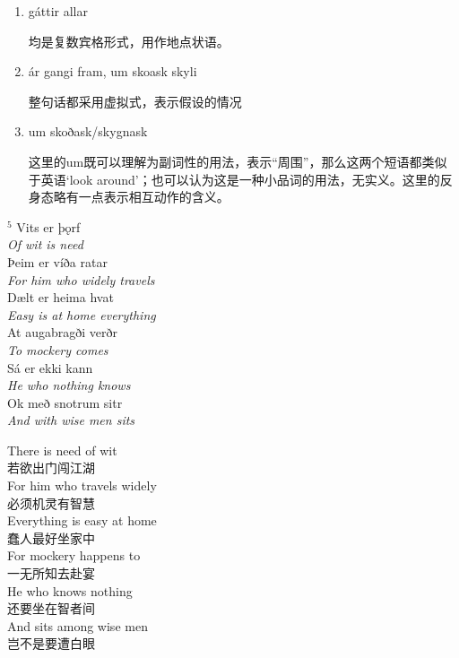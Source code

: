 \begin{grammar*}{}
    \begin{enumerate}[leftmargin=*]
        \item gáttir allar

              均是复数宾格形式，用作地点状语。

        \item \'a\dh r gangi fram, um sko\dh ask skyli

              整句话都采用虚拟式，表示假设的情况

        \item um skoðask/skygnask

              这里的um既可以理解为副词性的用法，表示“周围”，那么这两个短语都类似于英语`look around'；也可以认为这是一种小品词的用法，无实义。这里的反身态略有一点表示相互动作的含义。

    \end{enumerate}
\end{grammar*}
\medskip %
\begin{paracol}{2}
    \noindent
    $^5$ Vits er þǫrf\\
    \textit{Of wit is need}\\
    \MakeUppercase þeim er víða ratar\\
    \textit{For him who widely travels}\\
    Dælt er heima hvat\\
    \textit{Easy is at home everything}\\
    At augabragði verðr\\
    \textit{To mockery comes}\\
    Sá er ekki kann \\
    \textit{He who nothing knows}\\
    Ok með snotrum sitr\\
    \textit{And with wise men sits}\\

    \switchcolumn

    \noindent
    There is need of wit\\
    若欲出门闯江湖\\
    For him who travels widely\\
    必须机灵有智慧\\
    Everything is easy at home\\
    蠢人最好坐家中\\
    For mockery happens to\\
    一无所知去赴宴\\
    He who knows nothing\\
    还要坐在智者间\\
    And sits among wise men\\
    岂不是要遭白眼\\
\end{paracol}
